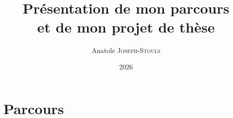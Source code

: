 \documentclass[aspectratio=169]{beamer}
\title[Parcours \& Thèse]{%
	Présentation de mon parcours\\[0.2em]
	et de mon projet de thèse}
\author{Anatole \textsc{Joseph-Stouls}}
\institute{ENS Rennes $\cdot$ LIED — Candidature EDPIF\\[0.2em]
}
\date{2026}
\begin{document}
	
	\begin{frame}
		\titlepage
	\end{frame}
	
	
	
	\section{Parcours}
	
\end{document}
